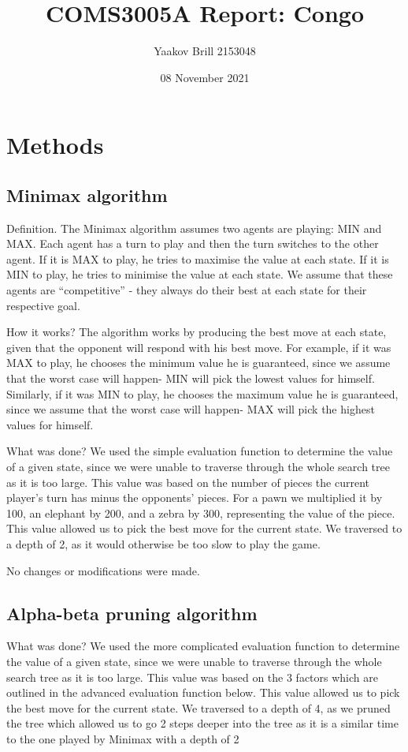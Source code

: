 \documentclass[twocolumn]{article}
\title{COMS3005A Report: Congo}
\author{Yaakov Brill 2153048}
\date{08 November 2021}
\begin{document}
\maketitle

\section{Methods}

\subsection{Minimax algorithm}

Definition. The Minimax algorithm assumes two agents are playing: MIN and MAX. Each agent has a turn to play and then the turn switches to the other agent. If it is MAX to play, he tries to maximise the value at each state. If it is MIN to play, he tries to minimise the value at each state. We assume that these agents are “competitive” - they always do their best at each state for their respective goal.


How it works? The algorithm works by producing the best move at each state, given that the opponent will respond with his best move. For example, if it was MAX to play, he chooses the minimum value he is guaranteed, since we assume that the worst case will happen- MIN will pick the lowest values for himself. Similarly, if it was MIN to play, he chooses the maximum value he is guaranteed, since we assume that the worst case will happen- MAX will pick the highest values for himself.


What was done? We used the simple evaluation function to determine the value of a given state, since we were unable to traverse through the whole search tree as it is too large. This value was based on the number of pieces the current player’s turn has minus the opponents’ pieces. For a pawn we multiplied it by 100, an elephant by 200, and a zebra by 300, representing the value of the piece. This value allowed us to pick the best move for the current state. We traversed to a depth of 2, as it would otherwise be too slow to play the game.

No changes or modifications were made.

\subsection{Alpha-beta pruning algorithm}

What was done? We used the more complicated evaluation function to determine the value of a given state, since we were unable to traverse through the whole search tree as it is too large. This value was based on the 3 factors which are outlined in the advanced evaluation function below. This value allowed us to pick the best move for the current state. We traversed to a depth of 4, as we pruned the tree which allowed us to go 2 steps deeper into the tree as it is a similar time to the one played by Minimax with a depth of 2
\end{document}
